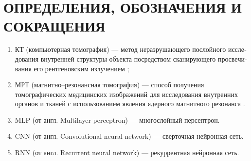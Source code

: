 \section*{ОПРЕДЕЛЕНИЯ, ОБОЗНАЧЕНИЯ И СОКРАЩЕНИЯ}

\begin{enumerate}[leftmargin=1.6\parindent]
\item КТ (компьютерная томография) --- ме­тод не­раз­ру­шаю­ще­го по­слой­но­го ис­сле­до­ва­ния внут­рен­ней струк­ту­ры объ­ек­та по­сред­ст­вом ска­ни­рую­ще­го про­све­чи­ва­ния его рент­ге­нов­ским из­лу­че­ни­ем \cite{kt};
\item МРТ (магнитно--резонансная томография) --- способ получения томографических медицинских изображений для исследования внутренних органов и тканей с использованием явления ядерного магнитного резонанса \cite{mrt}.
\item MLP (от англ. Multilayer perceptron) --- многослойный персептрон.
\item CNN (от англ. Convolutional neural network) --- сверточная нейронная сеть. 
\item RNN (от англ. Recurrent neural network) --- рекуррентная нейронная сеть. 
\end{enumerate}